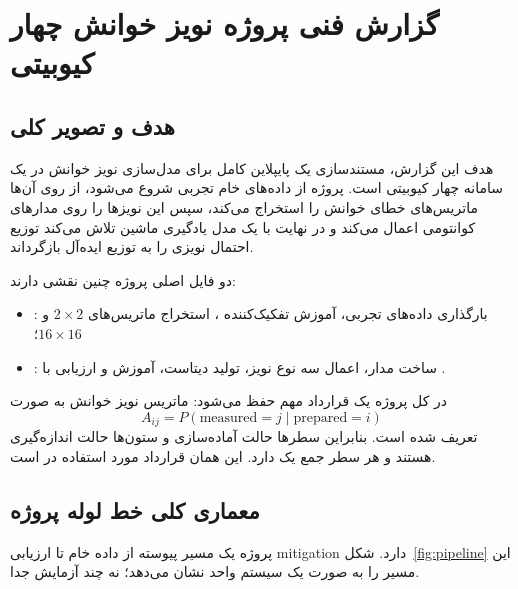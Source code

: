 \chapter*{گزارش فنی پروژه نویز خوانش چهار کیوبیتی}

\section{هدف و تصویر کلی}

هدف این گزارش، مستندسازی یک پایپلاین کامل برای مدل‌سازی نویز خوانش در یک سامانه چهار کیوبیتی است. پروژه از داده‌های خام تجربی  شروع می‌شود، از روی آن‌ها ماتریس‌های خطای خوانش را استخراج می‌کند، سپس این نویزها را روی مدارهای کوانتومی اعمال می‌کند و در نهایت با یک مدل یادگیری ماشین تلاش می‌کند توزیع احتمال نویزی را به توزیع ایده‌آل بازگرداند.

دو فایل اصلی پروژه چنین نقشی دارند:
\begin{itemize}
	\item {}: بارگذاری داده‌های تجربی، آموزش تفکیک‌کننده ، استخراج ماتریس‌های $2\times2$ و $16\times16$؛
	\item {}: ساخت مدار، اعمال سه نوع نویز، تولید دیتاست، آموزش  و ارزیابی با .
\end{itemize}

در کل پروژه یک قرارداد مهم حفظ می‌شود: ماتریس نویز خوانش به صورت
\begin{equation}
	A_{ij}=P(\text{measured}=j \mid \text{prepared}=i)
	\label{eq:assignment-convention}
\end{equation}
تعریف شده است. بنابراین سطرها حالت آماده‌سازی و ستون‌ها حالت اندازه‌گیری هستند و هر سطر جمع یک دارد. این همان قرارداد مورد استفاده در  است.

\section{معماری کلی خط لوله پروژه}

پروژه یک مسیر پیوسته از داده خام تا ارزیابی mitigation دارد. شکل~\ref{fig:pipeline} این مسیر را به صورت یک سیستم واحد نشان می‌دهد؛ نه چند آزمایش جدا.

